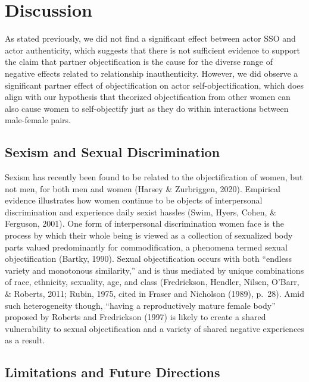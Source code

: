 \documentclass[man]{apa6}
\begin{document}
\section{Discussion}\label{discussion}

As stated previously, we did not find a significant effect between actor
SSO and actor authenticity, which suggests that there is not sufficient
evidence to support the claim that partner objectification is the cause
for the diverse range of negative effects related to relationship
inauthenticity. However, we did observe a significant partner effect of
objectification on actor self-objectification, which does align with our
hypothesis that theorized objectification from other women can also
cause women to self-objectify just as they do within interactions
between male-female pairs.

\subsection{Sexism and Sexual
Discrimination}\label{sexism-and-sexual-discrimination}

Sexism has recently been found to be related to the objectification of
women, but not men, for both men and women (Harsey \& Zurbriggen, 2020).
Empirical evidence illustrates how women continue to be objects of
interpersonal discrimination and experience daily sexist hassles (Swim,
Hyers, Cohen, \& Ferguson, 2001). One form of interpersonal
discrimination women face is the process by which their whole being is
viewed as a collection of sexualized body parts valued predominantly for
commodification, a phenomena termed sexual objectification (Bartky,
1990). Sexual objectification occurs with both \enquote{endless variety
and monotonous similarity,} and is thus mediated by unique combinations
of race, ethnicity, sexuality, age, and class (Fredrickson, Hendler,
Nilsen, O'Barr, \& Roberts, 2011; Rubin, 1975, cited in Fraser and
Nicholson (1989), p.~28). Amid such heterogeneity though,
\enquote{having a reproductively mature female body} proposed by Roberts
and Fredrickson (1997) is likely to create a shared vulnerability to
sexual objectification and a variety of shared negative experiences as a
result.

\subsection{Limitations and Future
Directions}\label{limitations-and-future-directions}
\end{document}
